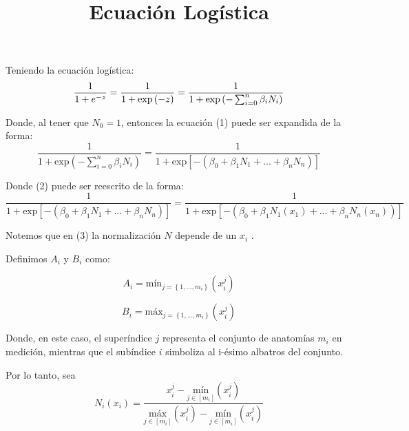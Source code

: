 \documentclass{article}
\begin{document}
\title{Ecuación Logística}
\maketitle
Teniendo la ecuación logística:
\begin{equation}
    \label{simple_equation}
    \frac{1}{1+e^{-z}} = \frac{1}{1+\mbox{\mbox{exp}}\left ( -z\right )} = \frac{1}{1+\mbox{\mbox{exp}}\left (-\sum_{i=0}^{n} \beta _{i}N_{i} \right )}
\end{equation}

Donde, al tener que $N_{0}=1$, entonces la ecuación (1) puede ser expandida de la forma:
\begin{equation}
    \label{simple_equation}
    \frac{1}{1+\mbox{exp}\left (-\sum_{i=0}^{n} \beta _{i}N_{i} \right )} = \frac{1}{1+\mbox{exp}\left [ -\left ( \beta _{0} + \beta _{1}N_{1}+...+\beta_{n}N_{n} \right ) \right ]}
\end{equation}

Donde (2) puede ser reescrito de la forma:
\begin{equation}
    \label{simple_equiation}    
    \frac{1}{1+\mbox{exp}\left [ -\left ( \beta _{0} + \beta _{1}N_{1}+...+\beta_{n}N_{n} \right ) \right ]} = \frac{1}{1+\mbox{exp}\left [ -\left ( \beta _{0} + \beta _{1}N_{1}(x_{1})+...+\beta_{n}N_{n} (x_{n})\right ) \right ]}
\end{equation}

Notemos que en (3) la normalización $N$ depende de un $x_{i}$ .

Definimos $A_{i}$ y $B_{i}$ como:

\begin{equation}
    \label{simple_equiation}
    A_{i}= \mbox{mín}_{j=\left \{1,...,m_{i} \right \}}\left ( x_{i}^{j} \right )
\end{equation}

\begin{equation}
    \label{simple_equiation}
    B_{i}= \mbox{máx}_{j=\left \{ 1,...,m_{i} \right \}}\left ( x_{i}^{j} \right )
\end{equation}

Donde, en este caso, el superíndice $j$ representa el conjunto de anatomías $m_i$  en medición, mientras que el subíndice $i$ simboliza al i-ésimo albatros del conjunto.


Por lo tanto, sea 
\begin{equation} N_{i} \left ( x_{i} \right )= \frac{x_{i}^{j} - \underset{j\in [m_{i} ]}{\mbox{mín}}\left (  x_{i}^{j}\right )}{\underset{j\in [m_{i} ]}{\mbox{máx}}\left (  x_{i}^{j}\right )-\underset{j\in [m_{i} ]}{\mbox{mín}}\left (  x_{i}^{j}\right )}
\end{equation}
\end{document}

